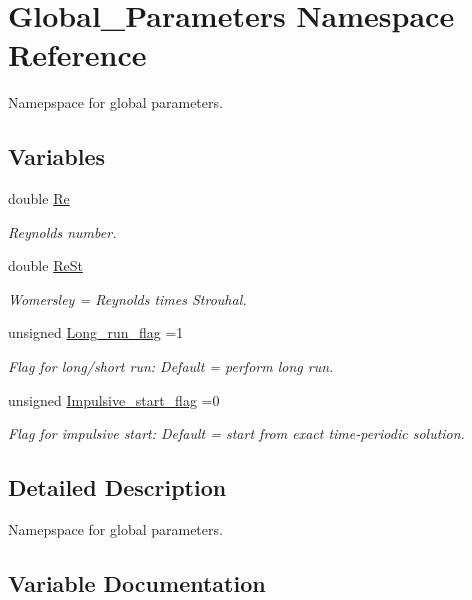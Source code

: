 \hypertarget{namespaceGlobal__Parameters}{}\section{Global\+\_\+\+Parameters Namespace Reference}
\label{namespaceGlobal__Parameters}


Namepspace for global parameters.  


\subsection*{Variables}
\begin{DoxyCompactItemize}
\item 
double \hyperlink{namespaceGlobal__Parameters_a9d72e94a9305c6a310940a6a427ebe06}{Re}
\begin{DoxyCompactList}\small\item\em Reynolds number. \end{DoxyCompactList}\item 
double \hyperlink{namespaceGlobal__Parameters_a7a59a32365e87566069e458dc83bd18a}{Re\+St}
\begin{DoxyCompactList}\small\item\em Womersley = Reynolds times Strouhal. \end{DoxyCompactList}\item 
unsigned \hyperlink{namespaceGlobal__Parameters_a457472b8222bb6bb0d97b2aed78d1ef4}{Long\+\_\+run\+\_\+flag} =1
\begin{DoxyCompactList}\small\item\em Flag for long/short run\+: Default = perform long run. \end{DoxyCompactList}\item 
unsigned \hyperlink{namespaceGlobal__Parameters_aec41eb8da4929003e5d78ef4b43c0ed9}{Impulsive\+\_\+start\+\_\+flag} =0
\begin{DoxyCompactList}\small\item\em Flag for impulsive start\+: Default = start from exact time-\/periodic solution. \end{DoxyCompactList}\end{DoxyCompactItemize}


\subsection{Detailed Description}
Namepspace for global parameters. 

\subsection{Variable Documentation}
\mbox{\label{namespaceGlobal__Parameters_aec41eb8da4929003e5d78ef4b43c0ed9}} 
